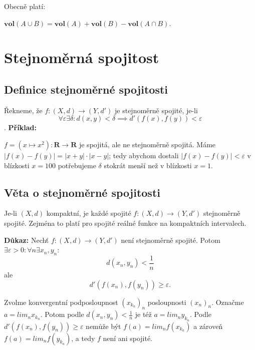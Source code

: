 \documentclass[10pt]{article}
\begin{document}
Obecně platí:

$\mathbf{vol}(A \cup B) = \mathbf{vol}(A)+\mathbf{vol}(B)-\mathbf{vol}(A \cap B).$
\noindent


\section{Stejnoměrná spojitost}
\subsection{Definice stejnoměrné spojitosti}
\hspace{1.2mm}

Řekneme, že $f : (X,d) \rightarrow (Y,d')$ je stejnoměrně spojité, je-li
\[\forall \varepsilon \exists \delta : d(x,y) < \delta \implies d'(f(x),f(y)) < \varepsilon\].
\noindent
\textbf{Příklad:}

$f = (x \mapsto x^2) : \mathbf{R} \rightarrow \mathbf{R}$ je spojitá, ale ne stejnoměrně spojitá.
Máme $|f(x) - f(y)| = |x+y| \cdot |x-y|$; tedy abychom dostali $|f(x)-f(y)| < \varepsilon $ v 
blízkosti $x = 100$ potřebujeme $\delta$ stokrát menší než v blízkosti $x = 1$.

\subsection{Věta o stejnoměrné spojitosti}
\hspace{1.2mm}
Je-li $(X,d)$ kompaktní, je každé spojité $f : (X,d) \rightarrow (Y,d')$ stejnoměrně spojité. Zejména to platí 
pro spojité reálné funkce na kompaktních intervalech.


\vspace{5mm}
\noindent
\textbf{Důkaz:} Nechť $f : (X,d) \rightarrow (Y,d')$ není stejnoměrně spojité. Potom $\exists \varepsilon > 0 : \forall n \exists x_n, y_n :$
\[d(x_n,y_n) < \frac{1}{n}\]
ale
\[d'(f(x_n),f(y_n)) \geq \varepsilon.\]

Zvolme konvergentní podposloupnost $(x_{k_n})_n$ posloupnosti $(x_n)_n$. Označme $a = lim_n x_{k_n}.$ Potom podle $d(x_n,y_n) < \frac{1}{n}$ je též 
$a = lim_n y_{k_n}.$ Podle $d'(f(x_n),f(y_n)) \geq \varepsilon$ nemůže být $f(a) = lim_n f(x_{k_n})$ a zároveň $f(a) = lim_n f(y_{k_n})$, 
a tedy $f$ není ani spojité.
\end{document}
